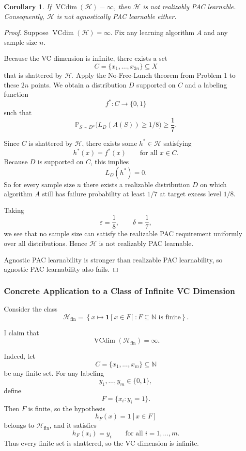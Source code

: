\documentclass{article}
\newtheorem{corollary}[theorem]{Corollary}
\theoremstyle{definition}
\theoremstyle{remark}
\newcommand{\PP}{\mathbb{P}}
\newcommand{\cH}{\mathcal{H}}
\newcommand{\ind}{\mathbf{1}}
\begin{document}
\begin{corollary}
\label{cor:vc-infinite-not-pac}
If $\operatorname{VCdim}(\cH)=\infty$, then $\cH$ is not realizably PAC learnable. Consequently, $\cH$ is not agnostically PAC learnable either.
\end{corollary}

\begin{proof}
Suppose $\operatorname{VCdim}(\cH)=\infty$. Fix any learning algorithm $A$ and any sample size $n$.

Because the VC dimension is infinite, there exists a set
$$
C=\{x_1,\dots,x_{2n}\}\subseteq X
$$
that is shattered by $\cH$. Apply the No-Free-Lunch theorem from Problem 1 to these $2n$ points. We obtain a distribution $D$ supported on $C$ and a labeling function
$$
f^*:C\to\{0,1\}
$$
such that
$$
\PP_{S\sim D^n}\bigl(L_D(A(S))\ge 1/8\bigr)\ge \frac{1}{7}.
$$

Since $C$ is shattered by $\cH$, there exists some $h^*\in\cH$ satisfying
$$
h^*(x)=f^*(x)
\qquad \text{for all } x\in C.
$$
Because $D$ is supported on $C$, this implies
$$
L_D(h^*)=0.
$$
So for every sample size $n$ there exists a realizable distribution $D$ on which algorithm $A$ still has failure probability at least $1/7$ at target excess level $1/8$.

Taking
$$
\varepsilon = \frac{1}{8},
\qquad
\delta = \frac{1}{7},
$$
we see that no sample size can satisfy the realizable PAC requirement uniformly over all distributions. Hence $\cH$ is not realizably PAC learnable.

Agnostic PAC learnability is stronger than realizable PAC learnability, so agnostic PAC learnability also fails.
\end{proof}

\subsubsection{Concrete Application to a Class of Infinite VC Dimension}

Consider the class
$$
\cH_{\mathrm{fin}}
=
\left\{
x \mapsto \ind[x\in F] : F\subseteq \mathbb{N} \text{ is finite}
\right\}.
$$

I claim that
$$
\operatorname{VCdim}(\cH_{\mathrm{fin}})=\infty.
$$

Indeed, let
$$
C=\{x_1,\dots,x_m\}\subseteq \mathbb{N}
$$
be any finite set. For any labeling
$$
y_1,\dots,y_m \in \{0,1\},
$$
define
$$
F=\{x_i : y_i=1\}.
$$
Then $F$ is finite, so the hypothesis
$$
h_F(x)=\ind[x\in F]
$$
belongs to $\cH_{\mathrm{fin}}$, and it satisfies
$$
h_F(x_i)=y_i
\qquad \text{for all } i=1,\dots,m.
$$
Thus every finite set is shattered, so the VC dimension is infinite.
\end{document}
